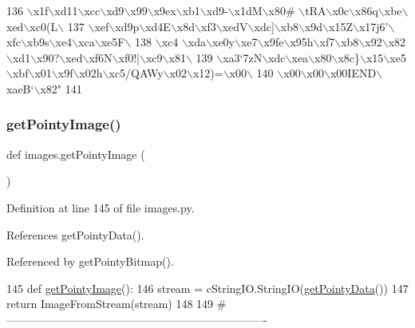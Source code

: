 \begin{DoxyCode}
136 \textcolor{stringliteral}{\(\backslash\)x1f\(\backslash\)xd11\(\backslash\)xcc\(\backslash\)xd9\(\backslash\)x99\(\backslash\)x9ex\(\backslash\)xb1\(\backslash\)xd9-\(\backslash\)x1dM\(\backslash\)x80# \(\backslash\)tRA\(\backslash\)x0c\(\backslash\)x86q\(\backslash\)xbe\(\backslash\)xed\(\backslash\)xc0(L\(\backslash\)}
137 \textcolor{stringliteral}{\(\backslash\)xef\(\backslash\)xd9p\(\backslash\)xd4E\(\backslash\)x8d\(\backslash\)xf3\(\backslash\)xedV\(\backslash\)xdc]\(\backslash\)xb8\(\backslash\)x9d\(\backslash\)x15Z\(\backslash\)x17j6'\(\backslash\)xfc\(\backslash\)xb9s\(\backslash\)xe4\(\backslash\)xca\(\backslash\)xe5F\(\backslash\)}
138 \textcolor{stringliteral}{\(\backslash\)xc4 \(\backslash\)xda\(\backslash\)xe0y\(\backslash\)xe7\(\backslash\)x9fe\(\backslash\)x95h\(\backslash\)xf7\(\backslash\)xb8\(\backslash\)x92\(\backslash\)x82\(\backslash\)xd1\(\backslash\)x90?\(\backslash\)xed\(\backslash\)xf6N\(\backslash\)xf0!|\(\backslash\)xc9\(\backslash\)x81\(\backslash\)}
139 \textcolor{stringliteral}{\(\backslash\)xa3`7zN\(\backslash\)xdc\(\backslash\)xea\(\backslash\)x80\(\backslash\)x8c\}\(\backslash\)x15\(\backslash\)xe5\(\backslash\)xbf\(\backslash\)x01\(\backslash\)x9f\(\backslash\)x02h\(\backslash\)xc5/QAWy\(\backslash\)x02\(\backslash\)x12)=\(\backslash\)x00\(\backslash\)}
140 \textcolor{stringliteral}{\(\backslash\)x00\(\backslash\)x00\(\backslash\)x00IEND\(\backslash\)xaeB`\(\backslash\)x82"}
141 
\end{DoxyCode}
\mbox{\label{namespaceimages_a38998e5e6aca706b4ea435db9d73ebcf}} 
\subsubsection{\texorpdfstring{get\+Pointy\+Image()}{getPointyImage()}}
{\footnotesize\ttfamily def images.\+get\+Pointy\+Image (\begin{DoxyParamCaption}{ }\end{DoxyParamCaption})}



Definition at line 145 of file images.\+py.



References get\+Pointy\+Data().



Referenced by get\+Pointy\+Bitmap().


\begin{DoxyCode}
145 \textcolor{keyword}{def }\hyperlink{namespaceimages_a38998e5e6aca706b4ea435db9d73ebcf}{getPointyImage}():
146     stream = cStringIO.StringIO(\hyperlink{namespaceimages_a79b62e36e634b9e6d8a72ea625ebc585}{getPointyData}())
147     \textcolor{keywordflow}{return} ImageFromStream(stream)
148 
149 \textcolor{comment}{#----------------------------------------------------------------------}
\end{DoxyCode}
\mbox{\label{namespaceimages_a0b31f0081ba1ffc239df9e1b29d4c02e}} 

